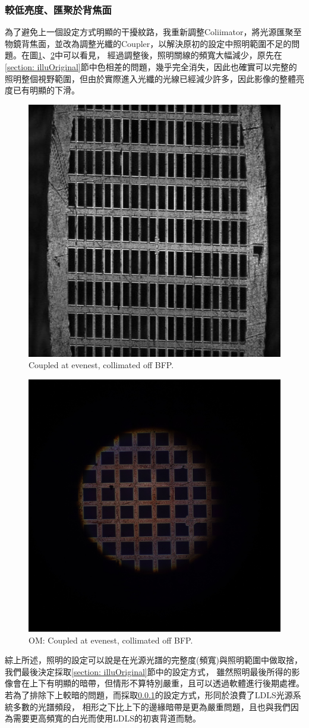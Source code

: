 \documentclass[12pt]{article}
\begin{document}
    \subsubsection{較低亮度、匯聚於背焦面} \label{illuDark}
    為了避免上一個設定方式明顯的干擾紋路，我重新調整Coliimator，將光源匯聚至物鏡背焦面，並改為調整光纖的Coupler，以解決原初的設定中照明範圍不足的問題。在圖\ref{figure: evenest_on}、\ref{figure: om_evenest_on}中可以看見，
    經過調整後，照明關線的頻寬大幅減少，原先在\ref{section: illuOriginal}節中色相差的問題，幾乎完全消失，因此也確實可以完整的照明整個視野範圍，但由於實際進入光纖的光線已經減少許多，因此影像的整體亮度已有明顯的下滑。
    \begin{figure}
        \centering
        \includegraphics[width=0.5\linewidth]{on_evenest.jpg}
        \caption{Coupled at evenest, collimated off BFP.}
        \label{figure: evenest_on}
    \end{figure}
    \begin{figure}
        \centering
        \includegraphics[width=0.5\linewidth]{om_on_evenest.JPG}
        \caption{OM: Coupled at evenest, collimated off BFP.}
        \label{figure: om_evenest_on}
    \end{figure}
    
    \noindent 綜上所述，照明的設定可以說是在光源光譜的完整度(頻寬)與照明範圍中做取捨，我們最後決定採取\ref{section: illuOriginal}節中的設定方式，
    雖然照明最後所得的影像會在上下有明顯的暗帶，但情形不算特別嚴重，且可以透過軟體進行後期處裡。若為了排除下上較暗的問題，而採取\ref{illuDark}的設定方式，形同於浪費了LDLS光源系統多數的光譜頻段，
    相形之下比上下的邊緣暗帶是更為嚴重問題，且也與我們因為需要更高頻寬的白光而使用LDLS的初衷背道而馳。
\end{document}
